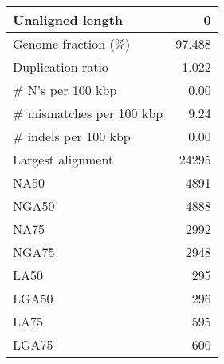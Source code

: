 \documentclass[12pt,a4paper]{article}
\begin{document}
\begin{table}[ht]
\begin{center}
\begin{tabular}{|l*{1}{|r}|}
Unaligned length & 0 \\ \hline
Genome fraction (\%) & 97.488 \\ \hline
Duplication ratio & 1.022 \\ \hline
\# N's per 100 kbp & 0.00 \\ \hline
\# mismatches per 100 kbp & 9.24 \\ \hline
\# indels per 100 kbp & 0.00 \\ \hline
Largest alignment & 24295 \\ \hline
NA50 & 4891 \\ \hline
NGA50 & 4888 \\ \hline
NA75 & 2992 \\ \hline
NGA75 & 2948 \\ \hline
LA50 & 295 \\ \hline
LGA50 & 296 \\ \hline
LA75 & 595 \\ \hline
LGA75 & 600 \\ \hline
\end{tabular}
\end{center}
\end{table}
\end{document}
